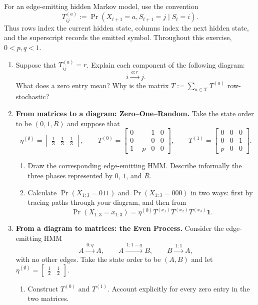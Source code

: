 \documentclass[11pt]{article}
\begin{document}
\begin{exercise}
\label{ex:p3-1}
  For an edge-emitting hidden Markov model, use the convention
  \[
    T^{(a)}_{ij}
      :=\Pr(X_{t+1}=a,S_{t+1}=j\mid S_t=i).
  \]
  Thus rows index the current hidden state, columns index the next hidden
  state, and the superscript records the emitted symbol. Throughout this
  exercise, $0<p,q<1$.

  \begin{enumerate}
    \item Suppose that $T^{(a)}_{ij}=r$. Explain each component of the
      following diagram:
      \[
        i\xrightarrow{\,a:r\,}j.
      \]
      What does a zero entry mean? Why is the matrix
      $T:=\sum_{a\in\mathcal X}T^{(a)}$ row-stochastic?

    \item \textbf{From matrices to a diagram: Zero--One--Random.}
      Take the state order to be $(0,1,R)$ and suppose that
      \[
        \eta^{(\emptyset)}
          =\begin{bmatrix}\tfrac13&\tfrac13&\tfrac13\end{bmatrix},
        \qquad
        T^{(0)}=
        \begin{bmatrix}
          0&1&0\\
          0&0&0\\
          1-p&0&0
        \end{bmatrix},
        \qquad
        T^{(1)}=
        \begin{bmatrix}
          0&0&0\\
          0&0&1\\
          p&0&0
        \end{bmatrix}.
      \]
      \begin{enumerate}
        \item Draw the corresponding edge-emitting HMM. Describe informally
          the three phases represented by $0$, $1$, and $R$.

        \item Calculate $\Pr(X_{1:3}=011)$ and
          $\Pr(X_{1:3}=000)$ in two ways: first by tracing paths through your
          diagram, and then from
          \[
            \Pr(X_{1:3}=x_{1:3})
              =\eta^{(\emptyset)}
                T^{(x_1)}T^{(x_2)}T^{(x_3)}\mathbf 1.
          \]
      \end{enumerate}

    \item \textbf{From a diagram to matrices: the Even Process.}
      Consider the edge-emitting HMM
      \[
        A\xrightarrow{\,0:q\,}A,
        \qquad
        A\xrightarrow{\,1:1-q\,}B,
        \qquad
        B\xrightarrow{\,1:1\,}A,
      \]
      with no other edges. Take the state order to be $(A,B)$ and let
      $\eta^{(\emptyset)}=\begin{bmatrix}\tfrac12&\tfrac12\end{bmatrix}$.
      \begin{enumerate}
        \item Construct $T^{(0)}$ and $T^{(1)}$. Account explicitly for every
          zero entry in the two matrices.


\end{enumerate}
\end{enumerate}
\end{exercise}
\end{document}
